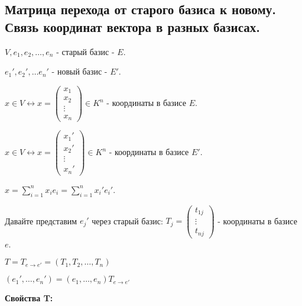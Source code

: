 \subsection{Матрица перехода от старого базиса к новому. Связь координат вектора в разных базисах.}

\(V, e_1, e_2, \ldots , e_n\) - старый базис - \(E\).

\(e_1',e_2',\ldots e_n'\) - новый базис - \(E'\).

\(x\in V \leftrightarrow x = \begin{pmatrix}
    x_1    \\
    x_2    \\
    \vdots \\
    x_n
\end{pmatrix} \in K^n\)  - координаты в базисе \(E\).

\(x\in V \leftrightarrow x = \begin{pmatrix}
    x_1'   \\
    x_2'   \\
    \vdots \\
    x_n'
\end{pmatrix} \in K^n\)  - координаты в базисе \(E'\).

\(x = \sum\limits_{i=1}^n x_i e_i = \sum\limits_{i=1}^n x_i' e_i'\).

Давайте представим \(e_j'\) через старый базис: \(T_j = \begin{pmatrix}
    t_{1j} \\
    \vdots \\
    t_{nj}
\end{pmatrix}\) - координаты в базисе \(e\).

\(T = T_{e \rightarrow e'} = (T_1, T_2, \ldots, T_n)\)

\((e_1', \ldots, e_n') = (e_1, \ldots, e_n) T_{e \rightarrow e'}\)

\textbf{Свойства T:}

